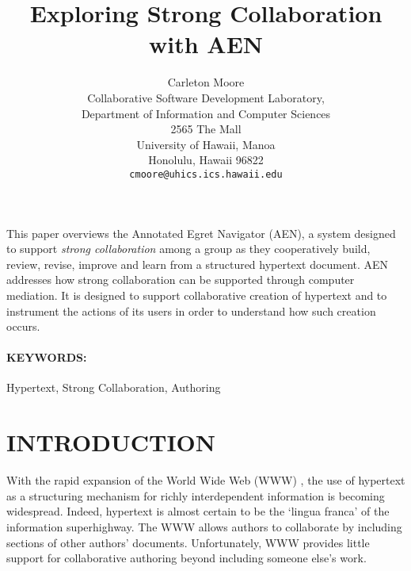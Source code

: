 



\title{Exploring Strong Collaboration with AEN}
\author{Carleton Moore\\
Collaborative Software Development Laboratory,\\
Department of Information and Computer Sciences\\
2565 The Mall\\
University of Hawaii, Manoa\\
Honolulu, Hawaii   96822\\
{\tt cmoore@uhics.ics.hawaii.edu}}
\maketitle
\abstract

This paper overviews the Annotated Egret Navigator (AEN), a system designed
to support {\em strong collaboration} among a group as they cooperatively
build, review, revise, improve and learn from a structured hypertext
document.  AEN addresses how strong collaboration can be supported through
computer mediation.  It is designed to support collaborative creation of
hypertext and to instrument the actions of its users in order to understand
how such creation occurs.

\paragraph{KEYWORDS:} Hypertext, Strong Collaboration, Authoring
\section{INTRODUCTION}

With the rapid expansion of the World Wide Web (WWW) \cite{Berners-Lee94},
the use of hypertext as a structuring mechanism for richly interdependent
information is becoming widespread.  Indeed, hypertext is almost certain to
be the `lingua franca' of the information superhighway.  The WWW allows
authors to collaborate by including sections of other authors' documents.
Unfortunately, WWW provides little support for collaborative authoring
beyond including someone else's work.

